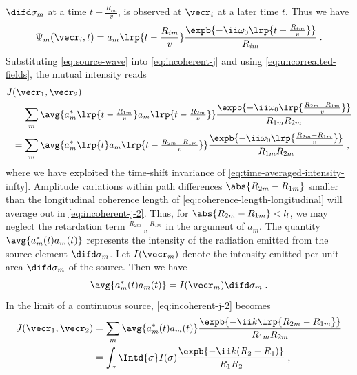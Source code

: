 \documentclass[
twoside,
openright,
titlepage,
numbers=noenddot,
headinclude,
fleqn,
a4paper,
footinclude=true,
cleardoublepage=empty,
abstractoff,
BCOR=5mm,
paper=a4,
fontsize=11pt,
british,ngerman,american,
]{scrreprt}
\begin{document}
$\difd\sigma_m$ at a time $t-\frac{R_{i m}}{v}$, is observed at
$\vecr_i$ at a later time $t$.  Thus we have
\begin{equation}
  \label{eq:source-wave}
  \Psi_m(\vecr_i,t) = a_m\lrp{t-\frac{R_{i m}}{v}} 
  \frac{\expb{-\ii\omega_0\lrp{t-\frac{R_{i m}}{v}}}}{R_{i m}} \;.
\end{equation}
Substituting \cref{eq:source-wave} into \cref{eq:incoherent-j} and
using \cref{eq:uncorrealted-fields}, the mutual intensity reads
\begin{equation}
  \label{eq:incoherent-j-2}
  \begin{split}
    J&(\vecr_1,\vecr_2)
    \\ & = \sum_m
    \avg{a^*_m\lrp{t-\tfrac{R_{1 m}}{v}} a_m\lrp{t-\tfrac{R_{2 m}}{v}}}
    \frac{\expb{-\ii\omega_0
        \lrp{\frac{R_{2 m}-R_{1 m}}{v}}}}{R_{1 m} R_{2 m}} 
    \\ & = \sum_m
    \avg{a^*_m\lrp{t} a_m\lrp{t-\tfrac{R_{2 m}-R_{1 m}}{v}}}
    \frac{\expb{-\ii\omega_0
        \lrp{\frac{R_{2 m}-R_{1 m}}{v}}}}{R_{1 m} R_{2 m}} \;,
  \end{split}
\end{equation}
where we have exploited the time-shift invariance of
\cref{eq:time-averaged-intensity-infty}.  Amplitude variations within
path differences $\abs{R_{2 m}-R_{1 m}}$ smaller than the longitudinal
coherence length of \cref{eq:coherence-length-longitudinal} will
average out in \cref{eq:incoherent-j-2}.  Thus, for $\abs{R_{2 m}-R_{1
    m}}<l_l$, we may neglect the retardation term $\frac{R_{2 m}-R_{1
    m}}{v}$ in the argument of $a_m$.  The quantity $\avg{a^*_m(t)
  a_m(t)}$ represents the intensity of the radiation emitted from the
source element $\difd\sigma_m$.  Let $I(\vecr_m)$ denote the intensity
emitted per unit area $\difd\sigma_m$ of the source. Then we have
\begin{equation}
  \label{eq:source-sum-to-int}
  \avg{a^*_m(t)a_m(t)}  = I(\vecr_m)\difd\sigma_m \;.
\end{equation}
In the limit of a continuous source, \cref{eq:incoherent-j-2}
becomes
\begin{equation}
  \label{eq:incoherent-j-3}
  \begin{split}
    J(\vecr_1,\vecr_2) & = \sum_m \avg{a^*_m(t) a_m(t)}
    \frac{\expb{-\ii k\lrp{R_{2 m}-R_{1 m}}}}{R_{1 m} R_{2 m}}
    \\ & = \int_\sigma \Intd{\sigma} I(\sigma)
    \frac{\expb{-\ii k(R_2-R_1)}}{R_1 R_2} \;,
  \end{split}
\end{equation}
\end{document}
